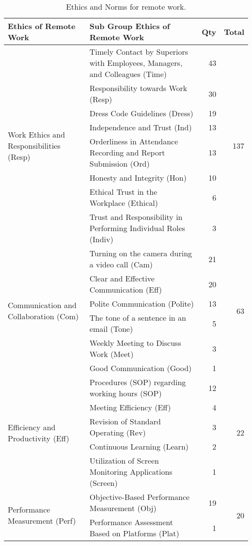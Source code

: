 \documentclass[conference]{IEEEtran}
\begin{document}
\begin{table}
	\centering
	\caption{Ethics and Norms for remote work.}
	\label{tab:ethics_for_remote_work}
	\begin{tabular}{|p{}|p{}|r|r|}
		\hline
		\textbf{Ethics of Remote Work} & \textbf{Sub Group Ethics of Remote Work} & \textbf{Qty} & \textbf{Total} \\ \hline
		\multirow{8}{=}{Work Ethics and Responsibilities (Resp)}   
		& Timely Contact by Superiors with Employees, Managers, and Colleagues (Time)  & 43 & \multirow{8}{*}{137} \\ \cline{2-3}
		& Responsibility towards Work (Resp) & 30 & \\ \cline{2-3}
		& Dress Code Guidelines (Dress) & 19 & \\ \cline{2-3}
		& Independence and Trust (Ind) & 13 & \\ \cline{2-3}
		& Orderliness in Attendance Recording and Report Submission (Ord) & 13 & \\ \cline{2-3}
		& Honesty and Integrity (Hon) & 10 & \\ \cline{2-3}
		& Ethical Trust in the Workplace (Ethical) & 6 & \\ \cline{2-3}
		& Trust and Responsibility in Performing Individual Roles (Indiv) & 3 & \\ \hline
		
		\multirow{6}{=}{Communication and Collaboration (Com)}    
		& Turning on the camera during a video call (Cam) & 21 & \multirow{6}{*}{63} \\ \cline{2-3}
		& Clear and Effective Communication (Eff) & 20 & \\ \cline{2-3}
		& Polite Communication (Polite) & 13 & \\ \cline{2-3}
		& The tone of a sentence in an email (Tone) & 5 & \\ \cline{2-3}
		& Weekly Meeting to Discuss Work (Meet) & 3 & \\ \cline{2-3}
		& Good Communication (Good) & 1 & \\ \hline
		
		\multirow{5}{=}{Efficiency and Productivity (Eff)}    
		& Procedures (SOP) regarding working hours (SOP) & 12 & \multirow{5}{*}{22} \\ \cline{2-3}
		& Meeting Efficiency (Eff) & 4 & \\ \cline{2-3}
		& Revision of Standard Operating (Rev) & 3 & \\ \cline{2-3}
		& Continuous Learning (Learn) & 2 & \\ \cline{2-3}
		& Utilization of Screen Monitoring Applications (Screen) & 1 & \\ \hline
		
		\multirow{2}{=}{Performance Measurement (Perf)} 
		& Objective-Based Performance Measurement (Obj) & 19 & \multirow{2}{*}{20} \\ \cline{2-3}
		& Performance Assessment Based on Platforms (Plat) & 1 & \\ \hline
	\end{tabular}
\end{table}
\end{document}
